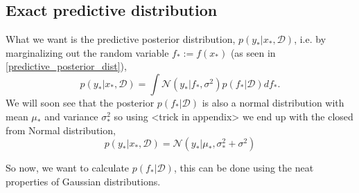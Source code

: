 \subsection{Exact predictive distribution}
What we want is the predictive posterior distribution, $p(y_*|x_*, \mathcal{D})$, i.e. by
marginalizing out the random variable $f_* := f(x_*)$ (as seen in
\eqref{predictive_posterior_dist}),
\begin{equation}\label{GP_predictive}
    p(y_*|x_*,\mathcal{D}) = \int \mathcal{N}(y_*|f_*, \sigma^2) p(f_*|\mathcal{D})df_*.
\end{equation}
We will soon see that the posterior $p(f_*|\mathcal{D})$ is also a normal distribution 
with mean $\mu_*$ and variance $\sigma^2_*$ so
using <trick in appendix> we end up with the closed from Normal distribution, 
$$p(y_*|x_*,\mathcal{D}) = \mathcal{N}(y_*|\mu_*,\sigma^2_*+\sigma^2)$$

So now, we want to calculate $p(f_*|\mathcal{D})$, this can be done using the neat properties of Gaussian
distributions.  
